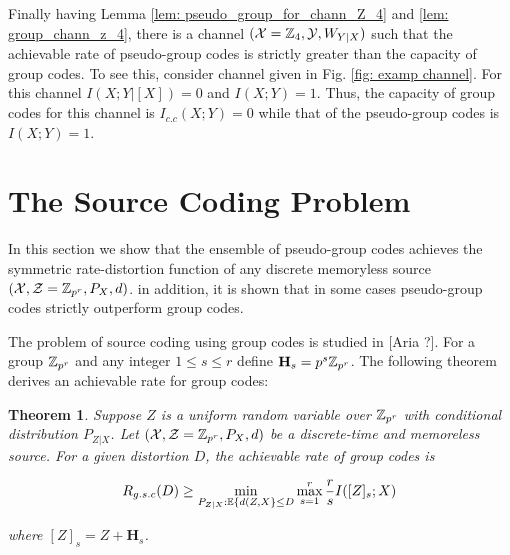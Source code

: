 \documentclass[conference]{IEEEtran}
\theoremstyle{plain}
\newtheorem{thm}{Theorem}
\theoremstyle{definition}
\theoremstyle{remark}
\begin{document}
Finally having Lemma \ref{lem: pseudo_group_for_chann_Z_4} and \ref{lem: group_chann_z_4}, there is a channel $(\mathcal{X}=\mathbb{Z}_4,\mathcal{Y}, W_{Y|X})$ such that the achievable rate of pseudo-group codes is strictly greater than the capacity of group codes. To see this, consider channel given in  Fig. \ref{fig: examp channel}. For this channel $I(X;Y|[X])=0$ and $I(X;Y)=1$. Thus, the capacity of group codes for this channel is $I_{c.c}(X;Y)=0$ while that of the pseudo-group codes is $I(X;Y)=1$.

 
\section{The Source Coding Problem}
In this section we show that the ensemble of pseudo-group codes achieves the symmetric rate-distortion function of any discrete memoryless source $(\mathcal{X}, \mathcal{Z}=\mathbb{Z}_{p^r}, P_X,d)$. in addition, it is shown that in some cases pseudo-group codes strictly outperform group codes.

The problem of source coding using group codes is studied in [Aria ?]. For a group $\mathbb{Z}_{p^r}$ and any integer $1\leq s \leq r$ define $\mathbf{H}_s=p^s\mathbb{Z}_{p^r}$. The following theorem derives an achievable rate for group codes: 


\begin{thm}\label{thm: group_codes_source}
Suppose $Z$ is a uniform random variable over $\mathbb{Z}_{p^r}$ with conditional distribution $P_{Z|X}$. Let $(\mathcal{X},\mathcal{Z}=\mathbb{Z}_{p^r},P_X,d)$ be a discrete-time and memoreless source. For a given distortion $D$, the achievable rate of group codes is 

\begin{equation*}
R_{g.s.c}(D) \geq \min_{P_{Z|X}: \mathbb{E}\{d(Z,X\}\leq D }\max_{s=1}^r \frac{r}{s} I([Z]_s;X) 
\end{equation*}

where $[Z]_s=Z+\mathbf{H}_s$.

\end{thm}



\end{document}
